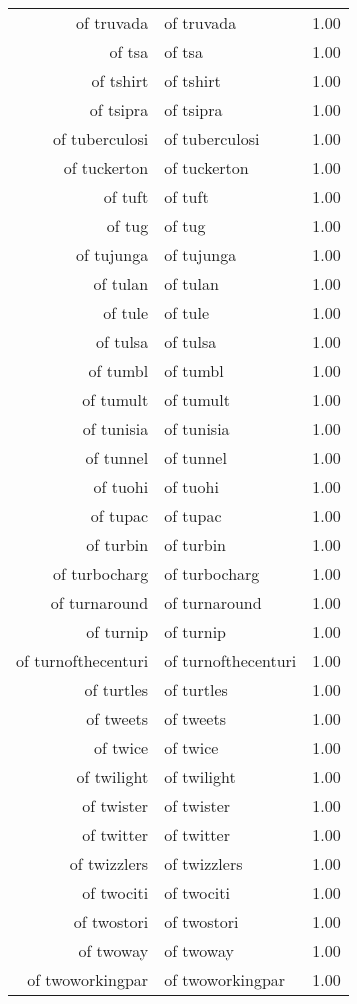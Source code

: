 \begin{table}[ht]
\begin{tabular}{rlr}
  of truvada & of truvada & 1.00 \\ 
  of tsa & of tsa & 1.00 \\ 
  of tshirt & of tshirt & 1.00 \\ 
  of tsipra & of tsipra & 1.00 \\ 
  of tuberculosi & of tuberculosi & 1.00 \\ 
  of tuckerton & of tuckerton & 1.00 \\ 
  of tuft & of tuft & 1.00 \\ 
  of tug & of tug & 1.00 \\ 
  of tujunga & of tujunga & 1.00 \\ 
  of tulan & of tulan & 1.00 \\ 
  of tule & of tule & 1.00 \\ 
  of tulsa & of tulsa & 1.00 \\ 
  of tumbl & of tumbl & 1.00 \\ 
  of tumult & of tumult & 1.00 \\ 
  of tunisia & of tunisia & 1.00 \\ 
  of tunnel & of tunnel & 1.00 \\ 
  of tuohi & of tuohi & 1.00 \\ 
  of tupac & of tupac & 1.00 \\ 
  of turbin & of turbin & 1.00 \\ 
  of turbocharg & of turbocharg & 1.00 \\ 
  of turnaround & of turnaround & 1.00 \\ 
  of turnip & of turnip & 1.00 \\ 
  of turnofthecenturi & of turnofthecenturi & 1.00 \\ 
  of turtles & of turtles & 1.00 \\ 
  of tweets & of tweets & 1.00 \\ 
  of twice & of twice & 1.00 \\ 
  of twilight & of twilight & 1.00 \\ 
  of twister & of twister & 1.00 \\ 
  of twitter & of twitter & 1.00 \\ 
  of twizzlers & of twizzlers & 1.00 \\ 
  of twociti & of twociti & 1.00 \\ 
  of twostori & of twostori & 1.00 \\ 
  of twoway & of twoway & 1.00 \\ 
  of twoworkingpar & of twoworkingpar & 1.00 \\ 

\end{tabular}
\end{table}
